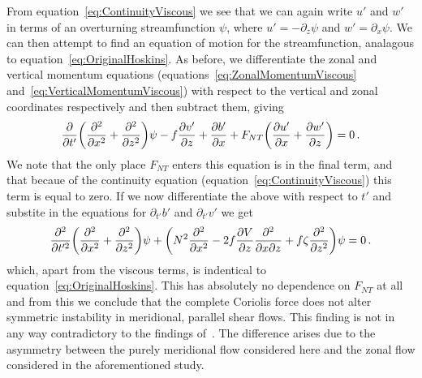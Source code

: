     From equation~\ref{eq:ContinuityViscous} we see that we can again write $u'$ and $w'$ in terms of an overturning streamfunction $\psi$, where $u' = - \partial_z \psi$ and $w' = \partial_x \psi$. We can then attempt to find an equation of motion for the streamfunction, analagous to equation~\ref{eq:OriginalHoskins}. As before, we differentiate the zonal and vertical momentum equations (equations~\ref{eq:ZonalMomentumViscous} and~\ref{eq:VerticalMomentumViscous}) with respect to the vertical and zonal coordinates respectively and then subtract them, giving
    \begin{equation}
        \pdv{}{t'} \bigg( \pdv[2]{x} + \pdv[2]{z} \bigg) \psi - f \pdv{v'}{z} + \pdv{b'}{x} + F_{NT} \bigg( \pdv{u'}{x} + \pdv{w'}{z} \bigg) = 0 \, .
    \end{equation}
    We note that the only place $F_{NT}$ enters this equation is in the final term, and that becaue of the continuity equation (equation~\ref{eq:ContinuityViscous}) this term is equal to zero. If we now differentiate the above with respect to $t'$ and substite in the equations for $\partial_{t'}b'$ and $\partial_{t'}v'$ we get
    \begin{equation}
        \frac{\partial^2}{\partial t'^2} \bigg(\pdv[2]{}{x} + \pdv[2]{}{z}\bigg) \psi + \bigg( N^2 \pdv[2]{}{x} - 2 f \pdv{V}{z} \pdv[2]{}{x}{z} + f \zeta \pdv[2]{}{z} \bigg) \psi = 0 \, .
    \end{equation}
    which, apart from the viscous terms, is indentical to equation~\ref{eq:OriginalHoskins}\footnotemark. This has absolutely no dependence on $F_{NT}$ at all and from this we conclude that the complete Coriolis force does not alter symmetric instability in meridional, parallel shear flows. This finding is not in any way contradictory to the findings of~\citet{Zeitlin2018a}. The difference arises due to the asymmetry between the purely meridional flow considered here and the zonal flow considered in the aforementioned study.

